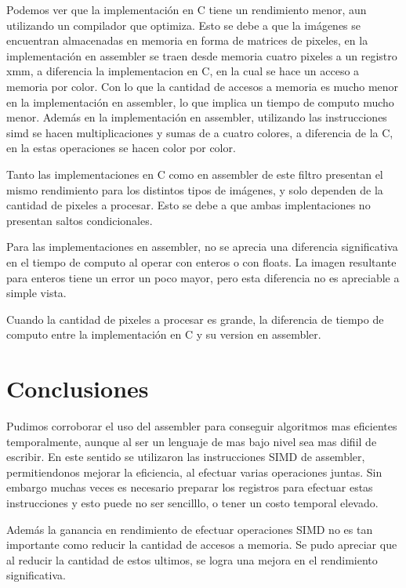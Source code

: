 \documentclass[a4paper]{article}
\begin{document}
Podemos ver que la implementación en C tiene un rendimiento menor, aun utilizando un compilador que optimiza. Esto se debe a que la imágenes se encuentran almacenadas en memoria en forma de matrices de pixeles, en la implementación en assembler se traen desde memoria cuatro pixeles a un registro xmm, a diferencia la implementacion en C, en la cual se hace un acceso a memoria por color. Con lo que la cantidad de accesos a memoria es mucho menor en la implementación en assembler, lo que implica un tiempo de computo mucho menor. Además en la implementación en assembler, utilizando las instrucciones simd se hacen multiplicaciones y sumas de a cuatro colores, a diferencia de la C, en la estas operaciones se hacen color por color.

Tanto las implementaciones en C como en assembler de este filtro presentan el mismo rendimiento para los distintos tipos de imágenes, y solo dependen de la cantidad de pixeles a procesar. Esto se debe a que ambas implentaciones no presentan saltos condicionales.

Para las implementaciones en assembler, no se aprecia una diferencia significativa en el tiempo de computo al operar con enteros o con floats. La imagen resultante para enteros tiene un error un poco mayor, pero esta diferencia no es apreciable a simple vista.

Cuando la cantidad de pixeles a procesar es grande, la diferencia de tiempo de computo entre la implementación en C y su version en assembler.


\section{Conclusiones}

Pudimos corroborar el uso del assembler para conseguir algoritmos mas eficientes temporalmente, aunque al ser un lenguaje de mas bajo nivel sea mas difiil de escribir. En este sentido se utilizaron las instrucciones SIMD de assembler, permitiendonos mejorar la eficiencia, al efectuar varias operaciones juntas. Sin embargo muchas veces es necesario preparar los registros para efectuar estas instrucciones y esto puede no ser sencilllo, o tener un costo temporal elevado.

Además la ganancia en rendimiento de efectuar operaciones SIMD no es tan importante como reducir la cantidad de accesos a memoria. Se pudo apreciar que al reducir la cantidad de estos ultimos, se logra una mejora en el rendimiento significativa.
\end{document}
